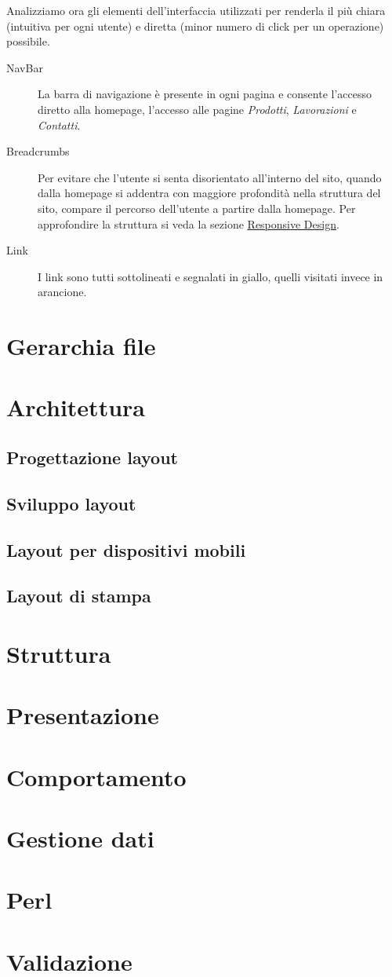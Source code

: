 \documentclass[11pt]{article}
\begin{document}
Analizziamo ora gli elementi dell'interfaccia utilizzati per renderla il più chiara (intuitiva per ogni utente) e diretta (minor numero di click per un operazione) possibile.
\begin{description}
	\item [NavBar] La barra di navigazione è presente in ogni pagina e consente l'accesso diretto alla homepage, l'accesso alle pagine \textit{Prodotti}, \textit{Lavorazioni} e \textit{Contatti}.
	\item [Breadcrumbs] Per evitare che l'utente si senta disorientato all'interno del sito, quando dalla homepage si addentra con maggiore profondità nella struttura del sito, compare il percorso dell'utente a partire dalla homepage. Per approfondire la struttura si veda la sezione \hyperref[sub:Responsivity]{\underline{Responsive Design}}.
	\item [Link] I link sono tutti sottolineati e segnalati in giallo, quelli visitati invece in arancione.
\end{description}

\newpage
\section{Gerarchia file}
\newpage
\section{Architettura}
\subsection{Progettazione layout}
\subsection{Sviluppo layout}
\subsection{Layout per dispositivi mobili}
\subsection{Layout di stampa}

\newpage
\section{Struttura}
\newpage

\section{Presentazione}
\newpage
\section{Comportamento}
\newpage
\section{Gestione dati}
\newpage
\section{Perl}
\newpage
\section{Validazione}
\end{document}
